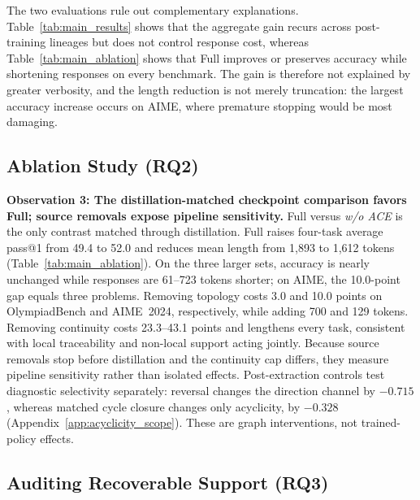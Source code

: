 The two evaluations rule out complementary explanations. Table~\ref{tab:main_results} shows that the aggregate gain recurs across post-training lineages but does not control response cost, whereas Table~\ref{tab:main_ablation} shows that Full improves or preserves accuracy while shortening responses on every benchmark. The gain is therefore not explained by greater verbosity, and the length reduction is not merely truncation: the largest accuracy increase occurs on AIME, where premature stopping would be most damaging.

\FloatBarrier

\subsection{Ablation Study (RQ2)}
\label{sec:rq2}

\noindent\textbf{Observation 3: The distillation-matched checkpoint comparison favors Full; source removals expose pipeline sensitivity.}
Full versus \emph{w/o ACE} is the only contrast matched through distillation. Full raises four-task average pass@1 from 49.4 to 52.0 and reduces mean length from 1{,}893 to 1{,}612 tokens (Table~\ref{tab:main_ablation}). On the three larger sets, accuracy is nearly unchanged while responses are 61--723 tokens shorter; on AIME, the 10.0-point gap equals three problems. Removing topology costs 3.0 and 10.0 points on OlympiadBench and AIME~2024, respectively, while adding 700 and 129 tokens. Removing continuity costs 23.3--43.1 points and lengthens every task, consistent with local traceability and non-local support acting jointly. Because source removals stop before distillation and the continuity cap differs, they measure pipeline sensitivity rather than isolated effects. Post-extraction controls test diagnostic selectivity separately: reversal changes the direction channel by $-0.715$, whereas matched cycle closure changes only acyclicity, by $-0.328$ (Appendix~\ref{app:acyclicity_scope}). These are graph interventions, not trained-policy effects.

\subsection{Auditing Recoverable Support (RQ3)}
\label{sec:rq3}

